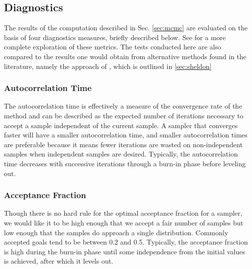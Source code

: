\documentclass[preprint]{aastex}
\begin{document}

\subsection{Diagnostics}
\label{sec:diag}

The results of the computation described in Sec. \ref{sec:mcmc} are evaluated on the basis of four diagnostics measures, briefly described below.  See \citet{for12} for a more complete exploration of these metrics.  The tests conducted here are also compared to the results one would obtain from alternative methods found in the literature, namely the approach of \citet{she11}, which is outlined in \ref{sec:sheldon}

\subsubsection{Autocorrelation Time}
\label{sec:acorr}

The autocorrelation time is effectively a measure of the convergence rate of the method and can be described as the expected number of iterations necessary to accept a sample independent of the current sample.  A sampler that converges faster will have a smaller autocorrelation time, and smaller autocorrelation times are preferable because it means fewer iterations are wasted on non-independent samples when independent samples are desired.  Typically, the autocorrelation time decreases with successive iterations through a burn-in phase before leveling out.

\subsubsection{Acceptance Fraction}
\label{sec:afrac}

Though there is no hard rule for the optimal acceptance fraction for a sampler, we would like it to be high enough that we accept a fair number of samples but low enough that the samples do approach a single distribution.  Commonly accepted goals tend to be between 0.2 and 0.5.  Typically, the acceptance fraction is high during the burn-in phase until some independence from the initial values is achieved, after which it levels out.
\end{document}
